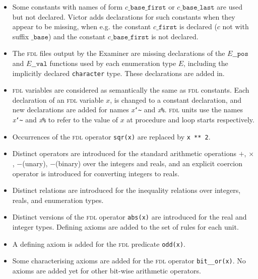 \documentclass[12pt,fleqn]{article}
\newcommand{\fdl}{\textsc{fdl}}
\newcommand{\tttilde}{{\tt \char`\~}}
\begin{document}
\begin{itemize}

\item Some constants with names of form 
   $\mathit{c}\mathtt{\_base\_first}$
   or $\mathit{c}\mathtt{\_base\_last}$
   are used but not declared.  Victor adds declarations for such constants
   when they appear to be missing, when e.g. the constant
   $\mathit{c}\mathtt{\_first}$ is declared ($c$ not with suffix $\mathtt{\_base}$) and the constant 
   $\mathit{c}\mathtt{\_base\_first}$ is not declared.

\item The \fdl{} files output by the Examiner are missing declarations
  of the $\mathit{E}\_\_\mathtt{pos}$
  and $\mathit{E}\_\_\mathtt{val}$ functions used by each enumeration type
  $E$, including the implicitly declared \texttt{character} type.  These
  declarations are added in.

\item \fdl{} variables are considered as semantically the same as
  \fdl{} constants.  Each declaration of an \fdl{} variable $x$, is
  changed to a constant declaration, and new declarations are added
  for names \textit{x}\tttilde{} and \textit{x}\texttt{\%}.  \fdl{}
  units use the names \textit{x}\tttilde{} and \textit{x}\texttt{\%}
  to refer to the value of $x$ at procedure and loop starts
  respectively.


\item Occurrences of the \fdl{} operator \texttt{sqr(x)} are replaced by 
  \texttt{x ** 2}.

\item Distinct operators are introduced for the standard arithmetic operations
  $+$, $\times$, $-$(unary), $-$(binary) over the integers and reals,
  and an explicit coercion operator is introduced for converting integers
  to reals.

\item Distinct relations are introduced for the inequality relations 
  over integers, reals, and enumeration types. 

\item Distinct versions of the \fdl{} operator \texttt{abs(x)} are introduced
  for the real and integer types.   Defining axioms are added to the set
  of rules for each unit.

\item A defining axiom is added for the \fdl{} predicate \texttt{odd(x)}.

\item Some characterising axioms are added for the \fdl{} operator
   \texttt{bit\_\_or(x)}.  No axioms are added yet for other bit-wise
   arithmetic operators.


\end{itemize}
\end{document}
